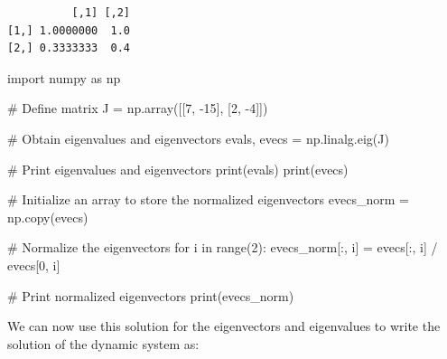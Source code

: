 \documentclass[
  letterpaper,
  DIV=11,
  numbers=noendperiod]{scrreprt}
\newenvironment{Shaded}{\begin{snugshade}}{\end{snugshade}}
\newcommand{\BuiltInTok}[1]{\textcolor[rgb]{0.00,0.23,0.31}{#1}}
\newcommand{\CommentTok}[1]{\textcolor[rgb]{0.37,0.37,0.37}{#1}}
\newcommand{\ControlFlowTok}[1]{\textcolor[rgb]{0.00,0.23,0.31}{#1}}
\newcommand{\DecValTok}[1]{\textcolor[rgb]{0.68,0.00,0.00}{#1}}
\newcommand{\ImportTok}[1]{\textcolor[rgb]{0.00,0.46,0.62}{#1}}
\newcommand{\KeywordTok}[1]{\textcolor[rgb]{0.00,0.23,0.31}{#1}}
\newcommand{\NormalTok}[1]{\textcolor[rgb]{0.00,0.23,0.31}{#1}}
\newcommand{\OperatorTok}[1]{\textcolor[rgb]{0.37,0.37,0.37}{#1}}
\begin{document}
\begin{verbatim}
          [,1] [,2]
[1,] 1.0000000  1.0
[2,] 0.3333333  0.4
\end{verbatim}

\begin{tcolorbox}[enhanced jigsaw, titlerule=0mm, breakable, bottomrule=.15mm, toprule=.15mm, colbacktitle=quarto-callout-note-color!10!white, rightrule=.15mm, toptitle=1mm, opacityback=0, left=2mm, coltitle=black, title=\textcolor{quarto-callout-note-color}{\faInfo}\hspace{0.5em}{Python code}, colframe=quarto-callout-note-color-frame, opacitybacktitle=0.6, leftrule=.75mm, bottomtitle=1mm, arc=.35mm, colback=white]

\begin{Shaded}
\begin{Highlighting}[]
\ImportTok{import}\NormalTok{ numpy }\ImportTok{as}\NormalTok{ np}

\CommentTok{\# Define matrix}
\NormalTok{J }\OperatorTok{=}\NormalTok{ np.array([[}\DecValTok{7}\NormalTok{, }\OperatorTok{{-}}\DecValTok{15}\NormalTok{],}
\NormalTok{              [}\DecValTok{2}\NormalTok{, }\OperatorTok{{-}}\DecValTok{4}\NormalTok{]])}

\CommentTok{\# Obtain eigenvalues and eigenvectors}
\NormalTok{evals, evecs }\OperatorTok{=}\NormalTok{ np.linalg.eig(J)}

\CommentTok{\# Print eigenvalues and eigenvectors}
\BuiltInTok{print}\NormalTok{(evals)}
\BuiltInTok{print}\NormalTok{(evecs)}

\CommentTok{\# Initialize an array to store the normalized eigenvectors}
\NormalTok{evecs\_norm }\OperatorTok{=}\NormalTok{ np.copy(evecs)}

\CommentTok{\# Normalize the eigenvectors}
\ControlFlowTok{for}\NormalTok{ i }\KeywordTok{in} \BuiltInTok{range}\NormalTok{(}\DecValTok{2}\NormalTok{):}
\NormalTok{    evecs\_norm[:, i] }\OperatorTok{=}\NormalTok{ evecs[:, i] }\OperatorTok{/}\NormalTok{ evecs[}\DecValTok{0}\NormalTok{, i]}

\CommentTok{\# Print normalized eigenvectors}
\BuiltInTok{print}\NormalTok{(evecs\_norm)}
\end{Highlighting}
\end{Shaded}

\end{tcolorbox}

We can now use this solution for the eigenvectors and eigenvalues to
write the solution of the dynamic system as:
\end{document}
